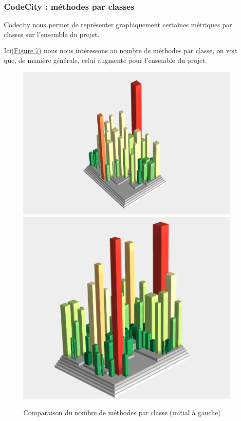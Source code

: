 \documentclass[a4paper,12pt]{report} %
\begin{document}
\subsubsection{CodeCity : méthodes par classes}
Codecity nous permet de représenter graphiquement certaines métriques
par classes sur l'ensemble du projet.

Ici(\hyperref[figure7]{Figure 7}) nous nous intéressons au nombre de méthodes par classe, on voit
que, de manière générale, celui augmente pour l'ensemble du projet.

\begin{figure}[!h]
\includegraphics[scale=0.5]{ressources/final_initial_declared_methods}\includegraphics[scale=0.5]{ressources/final_new_declared_methods}\caption{Comparaison du nombre de méthodes par classe (initial à gauche)}\label{figure7}


\end{figure}
\end{document}
